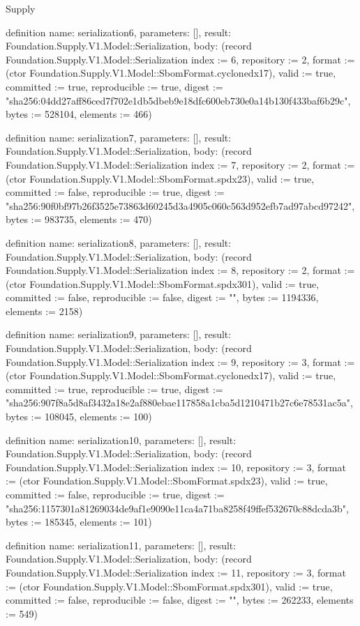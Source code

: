 \begin{lexlean}{Supply}
\begin{semanticmodule}
definition{
  name: serialization6,
  parameters: [],
  result: Foundation.Supply.V1.Model::Serialization,
  body: (record Foundation.Supply.V1.Model::Serialization {index := 6, repository := 2, format := (ctor Foundation.Supply.V1.Model::SbomFormat.cyclonedx17), valid := true, committed := true, reproducible := true, digest := "sha256:04dd27aff86ced7f702e1db5dbeb9e18dfc600eb730e0a14b130f433baf6b29c", bytes := 528104, elements := 466})
}

definition{
  name: serialization7,
  parameters: [],
  result: Foundation.Supply.V1.Model::Serialization,
  body: (record Foundation.Supply.V1.Model::Serialization {index := 7, repository := 2, format := (ctor Foundation.Supply.V1.Model::SbomFormat.spdx23), valid := true, committed := false, reproducible := true, digest := "sha256:90f0bf97b26f3525e73863d60245d3a4905c060c563d952efb7ad97abcd97242", bytes := 983735, elements := 470})
}

definition{
  name: serialization8,
  parameters: [],
  result: Foundation.Supply.V1.Model::Serialization,
  body: (record Foundation.Supply.V1.Model::Serialization {index := 8, repository := 2, format := (ctor Foundation.Supply.V1.Model::SbomFormat.spdx301), valid := true, committed := false, reproducible := false, digest := "", bytes := 1194336, elements := 2158})
}

definition{
  name: serialization9,
  parameters: [],
  result: Foundation.Supply.V1.Model::Serialization,
  body: (record Foundation.Supply.V1.Model::Serialization {index := 9, repository := 3, format := (ctor Foundation.Supply.V1.Model::SbomFormat.cyclonedx17), valid := true, committed := true, reproducible := true, digest := "sha256:907f8a5d8af3432a18e2af880ebae117858a1cba5d1210471b27c6e78531ac5a", bytes := 108045, elements := 100})
}

definition{
  name: serialization10,
  parameters: [],
  result: Foundation.Supply.V1.Model::Serialization,
  body: (record Foundation.Supply.V1.Model::Serialization {index := 10, repository := 3, format := (ctor Foundation.Supply.V1.Model::SbomFormat.spdx23), valid := true, committed := false, reproducible := true, digest := "sha256:1157301a81269034de9af1e9090e11ca4a71ba8258f49ffef532670c88dcda3b", bytes := 185345, elements := 101})
}

definition{
  name: serialization11,
  parameters: [],
  result: Foundation.Supply.V1.Model::Serialization,
  body: (record Foundation.Supply.V1.Model::Serialization {index := 11, repository := 3, format := (ctor Foundation.Supply.V1.Model::SbomFormat.spdx301), valid := true, committed := false, reproducible := false, digest := "", bytes := 262233, elements := 549})
}


\end{semanticmodule}
\end{lexlean}
